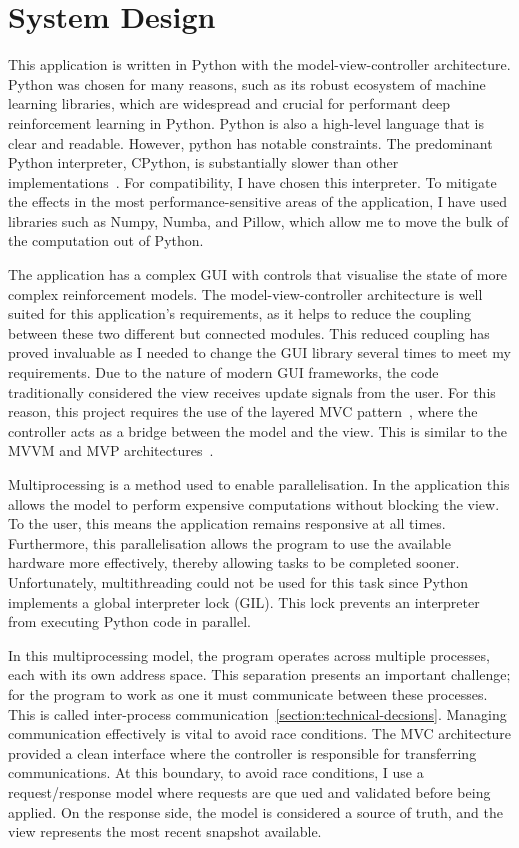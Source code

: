 \documentclass[]{final_report}
\begin{document}
\section{System Design}\label{section:system-design}

This application is written in Python with the model-view-controller architecture. Python was chosen for many reasons, such as its robust ecosystem of machine learning libraries, which are widespread and crucial for performant deep reinforcement learning in Python. Python is also a high-level language that is clear and readable. However, python has notable constraints. The predominant Python interpreter, CPython, is substantially slower than other implementations~\cite{pythonMachineLearning}. For compatibility, I have chosen this interpreter. To mitigate the effects in the most performance-sensitive areas of the application, I have used libraries such as Numpy, Numba, and Pillow, which allow me to move the bulk of the computation out of Python.  

The application has a complex GUI with controls that visualise the state of more complex reinforcement models. The model-view-controller architecture is well suited for this application's requirements, as it helps to reduce the coupling between these two different but connected modules. This reduced coupling has proved invaluable as I needed to change the GUI library several times to meet my requirements. Due to the nature of modern GUI frameworks, the code traditionally considered the view receives update signals from the user. For this reason, this project requires the use of the layered MVC pattern~\cite{webMVC,gamesMVC}, where the controller acts as a bridge between the model and the view. This is similar to the MVVM and MVP architectures~\cite{mvvm}.

Multiprocessing is a method used to enable parallelisation. In the application this allows the model to perform expensive computations without blocking the view. To the user, this means the application remains responsive at all times. Furthermore, this parallelisation allows the program to use the available hardware more effectively, thereby allowing tasks to be completed sooner. Unfortunately, multithreading could not be used for this task since Python implements a global interpreter lock (GIL). This lock prevents an interpreter from executing Python code in parallel. 

In this multiprocessing model, the program operates across multiple processes, each with its own address space. This separation presents an important challenge; for the program to work as one it must communicate between these processes. This is called inter-process communication~\ref{section:technical-decsions}. Managing communication effectively is vital to avoid race conditions. The MVC architecture provided a clean interface where the controller is responsible for transferring communications. At this boundary, to avoid race conditions, I use a request/response model where requests are que  ued and validated before being applied. On the response side, the model is considered a source of truth, and the view represents the most recent snapshot available.  
\end{document}

